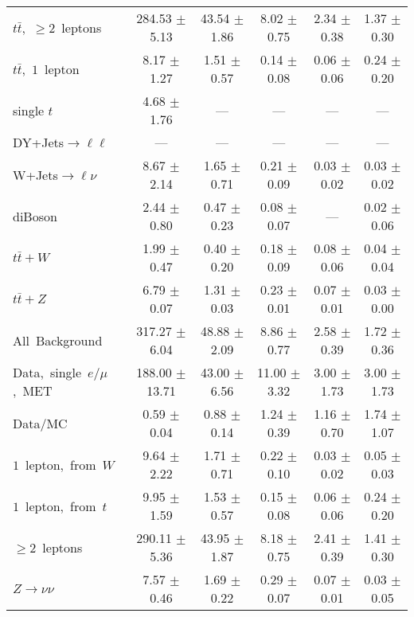 \documentclass{article}
\begin{document}
\begin{longtable}{|l|c|c|c|c|c|}
$t\bar{t}$,~$\ge2$~leptons & 284.53 $\pm$ 5.13  & 43.54 $\pm$ 1.86  & 8.02 $\pm$ 0.75  & 2.34 $\pm$ 0.38  & 1.37 $\pm$ 0.30 \\* 
$t\bar{t}$,~$1$~lepton & 8.17 $\pm$ 1.27  & 1.51 $\pm$ 0.57  & 0.14 $\pm$ 0.08  & 0.06 $\pm$ 0.06  & 0.24 $\pm$ 0.20 \\* 
single $t$  & 4.68 $\pm$ 1.76  & ---  & ---  & ---  & --- \\* 
DY+Jets$\rightarrow\ell\ell$  & ---  & ---  & ---  & ---  & --- \\* 
W+Jets$\rightarrow\ell\nu$  & 8.67 $\pm$ 2.14  & 1.65 $\pm$ 0.71  & 0.21 $\pm$ 0.09  & 0.03 $\pm$ 0.02  & 0.03 $\pm$ 0.02 \\* 
diBoson  & 2.44 $\pm$ 0.80  & 0.47 $\pm$ 0.23  & 0.08 $\pm$ 0.07  & ---  & 0.02 $\pm$ 0.06 \\* 
$t\bar{t}+W$  & 1.99 $\pm$ 0.47  & 0.40 $\pm$ 0.20  & 0.18 $\pm$ 0.09  & 0.08 $\pm$ 0.06  & 0.04 $\pm$ 0.04 \\* 
$t\bar{t}+Z$  & 6.79 $\pm$ 0.07  & 1.31 $\pm$ 0.03  & 0.23 $\pm$ 0.01  & 0.07 $\pm$ 0.01  & 0.03 $\pm$ 0.00 \\* 
\hline \hline 
All~Background  & 317.27 $\pm$ 6.04  & 48.88 $\pm$ 2.09  & 8.86 $\pm$ 0.77  & 2.58 $\pm$ 0.39  & 1.72 $\pm$ 0.36 \\* 
Data,~single~$e/\mu$,~MET  & 188.00 $\pm$ 13.71  & 43.00 $\pm$ 6.56  & 11.00 $\pm$ 3.32  & 3.00 $\pm$ 1.73  & 3.00 $\pm$ 1.73 \\* 
Data/MC  & 0.59 $\pm$ 0.04  & 0.88 $\pm$ 0.14  & 1.24 $\pm$ 0.39  & 1.16 $\pm$ 0.70  & 1.74 $\pm$ 1.07 \\* 
\hline \hline 
$1$~lepton,~from~$W$  & 9.64 $\pm$ 2.22  & 1.71 $\pm$ 0.71  & 0.22 $\pm$ 0.10  & 0.03 $\pm$ 0.02  & 0.05 $\pm$ 0.03 \\* 
$1$~lepton,~from~$t$  & 9.95 $\pm$ 1.59  & 1.53 $\pm$ 0.57  & 0.15 $\pm$ 0.08  & 0.06 $\pm$ 0.06  & 0.24 $\pm$ 0.20 \\* 
$\ge2$~leptons  & 290.11 $\pm$ 5.36  & 43.95 $\pm$ 1.87  & 8.18 $\pm$ 0.75  & 2.41 $\pm$ 0.39  & 1.41 $\pm$ 0.30 \\* 
$Z\rightarrow\nu\nu$  & 7.57 $\pm$ 0.46  & 1.69 $\pm$ 0.22  & 0.29 $\pm$ 0.07  & 0.07 $\pm$ 0.01  & 0.03 $\pm$ 0.05 \\* 
\hline 
\end{longtable} 

 
 
 
 
\pagebreak 

 
 
 
 
\end{document}
